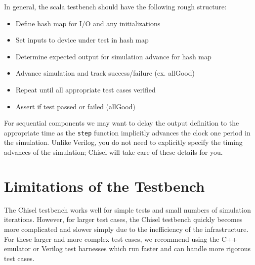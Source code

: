 In general, the scala testbench should have the following rough structure:

\begin{itemize}
\item Define hash map for I/O and any initializations
\item Set inputs to device under test in hash map
\item Determine expected output for simulation advance for hash map
\item Advance simulation and track success/failure (ex. allGood)
\item Repeat until all appropriate test cases verified
\item Assert if test passed or failed (allGood)
\end{itemize}

For sequential components we may want to delay the output definition to the appropriate time as the \verb+step+ function implicitly advances the clock one period in the simulation. Unlike Verilog, you do not need to explicitly specify the timing advances of the simulation; Chisel will take care of these details for you.

\section{Limitations of the Testbench}

The Chisel testbench works well for simple tests and small numbers of simulation iterations. However, for larger test cases, the Chisel testbench quickly becomes more complicated and slower simply due to the inefficiency of the infrastructure. For these larger and more complex test cases, we recommend using the C++ emulator or Verilog test harnesses which run faster and can handle more rigorous test cases.

